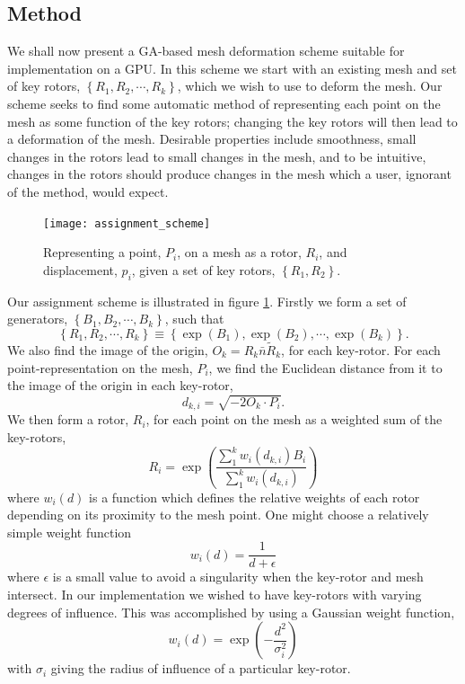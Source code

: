 \subsection{Method}

We shall now present a GA-based mesh deformation scheme suitable for
implementation on a GPU. In this scheme we start with
an existing mesh and set of key rotors, $\left\{ R_1, R_2, \cdots, R_k \right\}$,
which we wish to use to deform the mesh. Our scheme seeks to find some automatic
method of representing each point on the mesh as some function of the key
rotors; changing the key rotors will then lead to a deformation of the mesh. Desirable
properties include smoothness, small changes in the rotors lead to small changes
in the mesh, and to be intuitive, changes in the rotors should produce changes
in the mesh which a user, ignorant of the method, would expect.

\begin{figure}
\centering
\texttt{[image: assignment\_scheme]}
\caption{\label{fig:assignment_scheme}Representing a point, $P_i$, on a mesh as
a rotor, $R_i$, and displacement, $p_i$, given a set of key rotors, 
  $\left\{R_1, R_2\right\}$.}
\end{figure}

Our assignment scheme is illustrated in figure \ref{fig:assignment_scheme}.
Firstly we form a set of generators, $\left\{B_1, B_2, \cdots, B_k\right\}$,
such that
\[
\left\{ R_1, R_2, \cdots, R_k \right\} \equiv \left\{\exp(B_1), \exp(B_2),
        \cdots, \exp(B_k)\right\}.
\]
We also find the image of the origin, $O_k = R_k\bar{n}\tilde{R}_k$, for 
each key-rotor. For each point-representation on the mesh, $P_i$, we find the Euclidean
distance from it to the image of the origin in each key-rotor,
\[
\label{eqn:dki}
d_{k,i} = \sqrt{-2O_k \cdot P_i}.
\]
We then form a rotor, $R_i$, for each point on the mesh as a weighted sum of the
key-rotors,
\[
R_i = \exp\left(\frac{\sum^{k}_1 w_i(d_{k,i}) B_i}{\sum^{k}_1 w_i(d_{k,i})}\right)
\]
where $w_i(d)$ is a function which defines the relative weights of each rotor depending
on its proximity to the mesh point. One might choose a relatively simple weight function
\[
w_i(d) = \frac{1}{d + \epsilon}
\]
where $\epsilon$ is a small value to avoid a singularity when the key-rotor and mesh
intersect. In our implementation we wished to have key-rotors with varying degrees of 
influence. This was accomplished by using a Gaussian weight function,
\[
w_i(d) = \exp\left(-\frac{d^2}{\sigma_i^2}\right)
\]
with $\sigma_i$ giving the radius of influence of a particular key-rotor.


